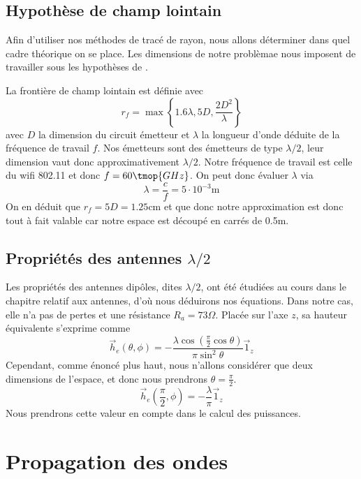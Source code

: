 \subsection{Hypoth{\`e}se de champ lointain}

Afin d'utiliser nos m{\'e}thodes de trac{\'e} de rayon, nous allons
d{\'e}terminer dans quel cadre th{\'e}orique on se place. Les dimensions de
notre probl{\`e}mae nous imposent de travailler sous les hypoth{\`e}ses de
.

La fronti{\`e}re de champ lointain est d{\'e}finie avec
\[ r_f = \max \left\{ 1.6 \lambda, 5 D, \frac{2 D^2}{\lambda} \right\} \]
avec $D$ la dimension du circuit {\'e}metteur et $\lambda$ la longueur d'onde
d{\'e}duite de la fr{\'e}quence de travail $f$. Nos {\'e}metteurs sont des
{\'e}metteurs de type $\lambda / 2$, leur dimension vaut donc
approximativement $\lambda / 2$. Notre fr{\'e}quence de travail est celle du
wifi 802.11 et donc $f = 60 \tmop{GHz}$. On peut donc {\'e}valuer $\lambda$
via
\[ \lambda = \frac{c}{f} = 5 \cdot 10^{- 3} \mathrm{m} \]
On en d{\'e}duit que $r_f = 5 D = 1.25 \mathrm{cm}$ et que donc notre
approximation est donc tout {\`a} fait valable car notre espace est
d{\'e}coup{\'e} en carr{\'e}s de 0.5m.

\subsection{Propri{\'e}t{\'e}s des antennes $\lambda / 2$}

Les propri{\'e}t{\'e}s des antennes dip{\^o}les, dites $\lambda / 2$, ont
{\'e}t{\'e} {\'e}tudi{\'e}es au cours dans le chapitre relatif aux antennes,
d'o{\`u} nous d{\'e}duirons nos {\'e}quations. Dans notre cas, elle n'a pas de
pertes et une r{\'e}sistance $R_a = 73 \Omega$. Plac{\'e}e sur l'axe $z$, sa
hauteur {\'e}quivalente s'exprime comme
\[ \vec{h}_e (\theta, \phi) = - \frac{\lambda \cos \left( \frac{\pi}{2} \cos
   \theta \right)}{\pi \sin^2 \theta} \vec{1}_z \]
Cependant, comme {\'e}nonc{\'e} plus haut, nous n'allons consid{\'e}rer que
deux dimensions de l'espace, et donc nous prendrons $\theta = \frac{\pi}{2}$.
\[ \vec{h}_e \left( \frac{\pi}{2}, \phi \right) = - \frac{\lambda}{\pi}
   \vec{1}_z \]
Nous prendrons cette valeur en compte dans le calcul des puissances.

\section{Propagation des ondes}

